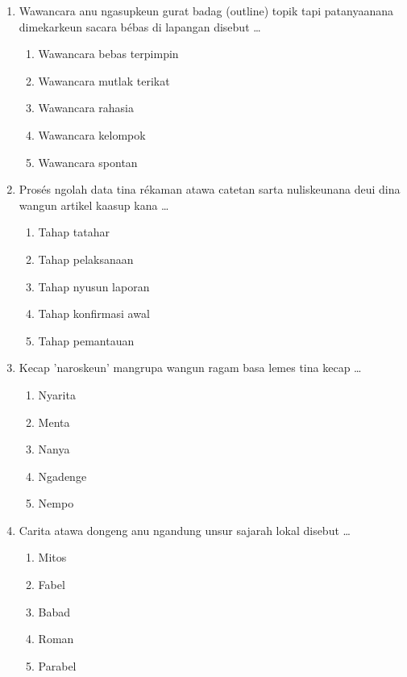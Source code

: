 \documentclass[12pt,a4paper]{article}
\begin{document}
\begin{enumerate}[leftmargin=*]
\item Wawancara anu ngasupkeun gurat badag (outline) topik tapi patanyaanana dimekarkeun sacara bébas di lapangan disebut \dots
    \begin{enumerate}[label=\alph*.]
        \item Wawancara bebas terpimpin
        \item Wawancara mutlak terikat
        \item Wawancara rahasia
        \item Wawancara kelompok
        \item Wawancara spontan
    \end{enumerate}

\item Prosés ngolah data tina rékaman atawa catetan sarta nuliskeunana deui dina wangun artikel kaasup kana \dots
    \begin{enumerate}[label=\alph*.]
        \item Tahap tatahar
        \item Tahap pelaksanaan
        \item Tahap nyusun laporan
        \item Tahap konfirmasi awal
        \item Tahap pemantauan
    \end{enumerate}

\item Kecap 'naroskeun' mangrupa wangun ragam basa lemes tina kecap \dots
    \begin{enumerate}[label=\alph*.]
        \item Nyarita
        \item Menta
        \item Nanya
        \item Ngadenge
        \item Nempo
    \end{enumerate}

\item Carita atawa dongeng anu ngandung unsur sajarah lokal disebut \dots
    \begin{enumerate}[label=\alph*.]
        \item Mitos
        \item Fabel
        \item Babad
        \item Roman
        \item Parabel
    \end{enumerate}


\end{enumerate}
\end{document}
